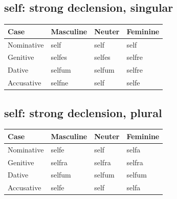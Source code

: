 \subsection*{self: strong declension, singular}

\par\begingroup
\fontsize{10.5}{13.2}\selectfont
\setlength{\LTleft}{0pt}\setlength{\LTright}{\fill}
\noindent
\begin{tabular}{@{}>{\raggedright\arraybackslash}p{28.89mm}>{\raggedright\arraybackslash}p{28.89mm}>{\raggedright\arraybackslash}p{28.89mm}>{\raggedright\arraybackslash}p{28.89mm}@{}}
\toprule
\textbf{Case} & \textbf{Masculine} & \textbf{Neuter} & \textbf{Feminine} \\
\midrule
Nominative & self & self & self \\
Genitive & selfes & selfes & selfre \\
Dative & selfum & selfum & selfre \\
Accusative & selfne & self & selfe \\
\bottomrule
\end{tabular}
\par\endgroup

\subsection*{self: strong declension, plural}

\par\begingroup
\fontsize{10.5}{13.2}\selectfont
\setlength{\LTleft}{0pt}\setlength{\LTright}{\fill}
\noindent
\begin{tabular}{@{}>{\raggedright\arraybackslash}p{28.89mm}>{\raggedright\arraybackslash}p{28.89mm}>{\raggedright\arraybackslash}p{28.89mm}>{\raggedright\arraybackslash}p{28.89mm}@{}}
\toprule
\textbf{Case} & \textbf{Masculine} & \textbf{Neuter} & \textbf{Feminine} \\
\midrule
Nominative & selfe & self & selfa \\
Genitive & selfra & selfra & selfra \\
Dative & selfum & selfum & selfum \\
Accusative & selfe & self & selfa \\
\bottomrule
\end{tabular}
\par\endgroup

